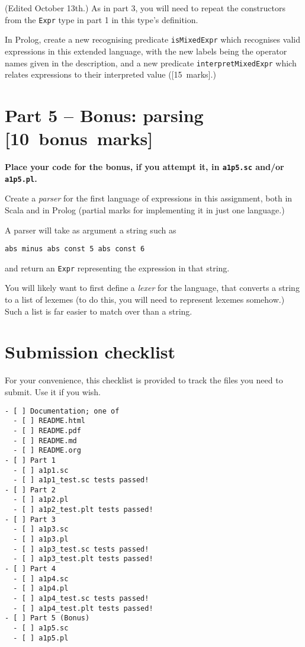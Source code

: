 \documentclass[11pt]{article}
\begin{document}
(Edited October 13th.)
As in part 3, you will need to repeat the constructors from the
\texttt{Expr} type in part 1 in this type's definition.

In Prolog, create a new recognising predicate \texttt{isMixedExpr} which
recognises valid expressions in this extended language,
with the new labels being the operator names given in the description,
and a new predicate \texttt{interpretMixedExpr} which relates
expressions to their interpreted value ([15 marks].)

\section*{Part 5 – Bonus: parsing                [10 bonus marks]}
\label{sec:orgbf0d390}
\begin{center}
\textbf{Place your code for the bonus, if you attempt it, in \texttt{a1p5.sc} and/or \texttt{a1p5.pl}.}
\end{center}

Create a \emph{parser} for the first language of expressions
in this assignment, both in Scala and in Prolog
(partial marks for implementing it in just one language.)

A parser will take as argument a string such as
\begin{verbatim}
abs minus abs const 5 abs const 6
\end{verbatim}
and return an \texttt{Expr} representing the expression in that string.

You will likely want to first define a \emph{lexer} for the language,
that converts a string to a list of lexemes
(to do this, you will need to represent lexemes somehow.)
Such a list is far easier to match over than a string.

\section*{Submission checklist}
\label{sec:org48d544b}
For your convenience, this checklist is provided
to track the files you need to submit.
Use it if you wish.
\begin{verbatim}
- [ ] Documentation; one of
  - [ ] README.html
  - [ ] README.pdf
  - [ ] README.md
  - [ ] README.org
- [ ] Part 1
  - [ ] a1p1.sc
  - [ ] a1p1_test.sc tests passed!
- [ ] Part 2
  - [ ] a1p2.pl
  - [ ] a1p2_test.plt tests passed!
- [ ] Part 3
  - [ ] a1p3.sc
  - [ ] a1p3.pl
  - [ ] a1p3_test.sc tests passed!
  - [ ] a1p3_test.plt tests passed!
- [ ] Part 4
  - [ ] a1p4.sc
  - [ ] a1p4.pl
  - [ ] a1p4_test.sc tests passed!
  - [ ] a1p4_test.plt tests passed!
- [ ] Part 5 (Bonus)
  - [ ] a1p5.sc
  - [ ] a1p5.pl
\end{verbatim}
\end{document}
